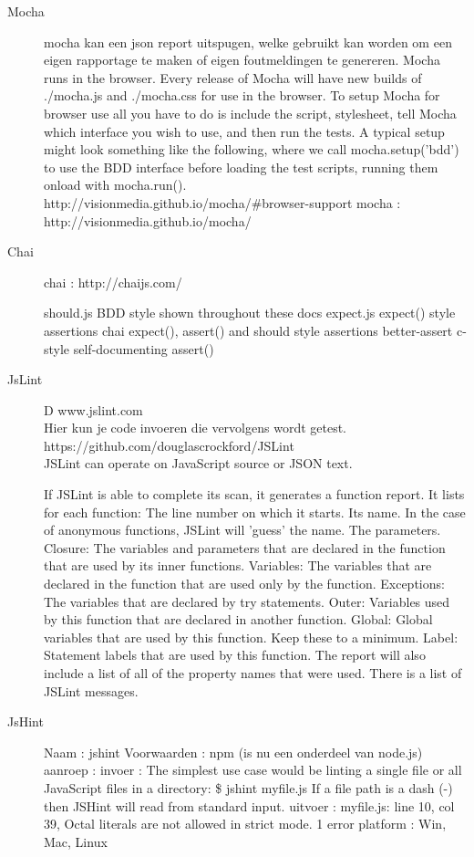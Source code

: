 \documentclass{article}
\begin{document}
\begin{description}
\item[Mocha]
mocha kan een json report uitspugen, welke gebruikt kan worden om een eigen rapportage te maken of eigen foutmeldingen te genereren.
Mocha runs in the browser. Every release of Mocha will have new builds of ./mocha.js and ./mocha.css for use in the browser. To setup Mocha for browser use all you have to do is include the script, stylesheet, tell Mocha which interface you wish to use, and then run the tests.
A typical setup might look something like the following, where we call mocha.setup('bdd') to use the BDD interface before loading the test scripts, running them onload with mocha.run().\\
http://visionmedia.github.io/mocha/\#browser-support
mocha : http://visionmedia.github.io/mocha/

\item[Chai]
chai  : http://chaijs.com/

should.js BDD style shown throughout these docs
expect.js expect() style assertions
chai expect(), assert() and should style assertions
better-assert c-style self-documenting assert()

\item[JsLint]D www.jslint.com\\Hier kun je code invoeren die vervolgens wordt getest.
https://github.com/douglascrockford/JSLint\\
JSLint can operate on JavaScript source or JSON text.

If JSLint is able to complete its scan, it generates a function report. It lists for each function:
The line number on which it starts.
Its name. In the case of anonymous functions, JSLint will 'guess' the name.
The parameters.
Closure: The variables and parameters that are declared in the function that are used by its inner functions.
Variables: The variables that are declared in the function that are used only by the function.
Exceptions: The variables that are declared by try statements.
Outer: Variables used by this function that are declared in another function.
Global: Global variables that are used by this function. Keep these to a minimum.
Label: Statement labels that are used by this function.
The report will also include a list of all of the property names that were used. There is a list of JSLint messages.

\item[JsHint]
Naam        : jshint
Voorwaarden : npm (is nu een onderdeel van node.js)
aanroep     :
invoer      : The simplest use case would be linting a single file or all JavaScript files in a directory:
              \$ jshint myfile.js
              If a file path is a dash (-) then JSHint will read from standard input.
uitvoer     : myfile.js: line 10, col 39, Octal literals are not allowed in strict mode.
              1 error
platform    : Win, Mac, Linux


\end{description}
\end{document}

